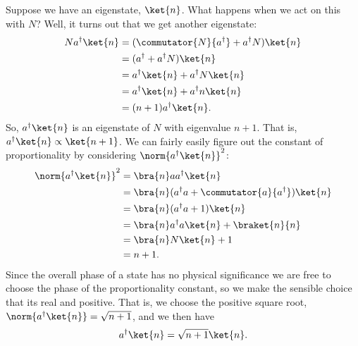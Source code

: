 \documentclass[fleqn]{NotesClass}
\newcommand{\hermit}{{\dagger}}
\begin{document}
    Suppose we have an eigenstate, \(\ket{n}\).
    What happens when we act on this with \(N\)?
    Well, it turns out that we get another eigenstate:
    \begin{align}
        N a^\hermit \ket{n} &= (\commutator{N}{a^\hermit} + a^\hermit N)\ket{n}\\
        &= (a^\hermit + a^\hermit N)\ket{n}\\
        &= a^\hermit \ket{n} + a^\hermit N \ket{n}\\
        &= a^\hermit \ket{n} + a^\hermit n \ket{n}\\
        &= (n + 1)a^\hermit \ket{n}.
    \end{align}
    So, \(a^\hermit \ket{n}\) is an eigenstate of \(N\) with eigenvalue \(n + 1\).
    That is, \(a^\hermit \ket{n} \propto \ket{n + 1}\).
    We can fairly easily figure out the constant of proportionality by considering \(\norm{a^\hermit\ket{n}}^2\):
    \begin{align}
        \norm{a^\hermit \ket{n}}^2 &= \bra{n} aa^\hermit \ket{n}\\
        &= \bra{n} (a^\hermit a + \commutator{a}{a^\hermit}) \ket{n}\\
        &= \bra{n} (a^\hermit a + 1) \ket{n}\\
        &= \bra{n} a^\hermit a \ket{n} + \braket{n}{n}\\
        &= \bra{n} N \ket{n} + 1\\
        &= n + 1.
    \end{align}
    Since the overall phase of a state has no physical significance we are free to choose the phase of the proportionality constant, so we make the sensible choice that its real and positive.
    That is, we choose the positive square root, \(\norm{a^\hermit \ket{n}} = \sqrt{n + 1}\), and we then have
    \begin{equation}
        a^\hermit \ket{n} = \sqrt{n + 1}\ket{n}.
    \end{equation}
    
\end{document}
